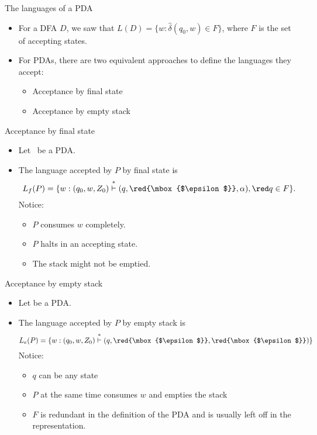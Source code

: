\documentclass{prosper}%
\newcommand{\e} {{\mbox{$\epsilon$}}}
\newcommand{\cvd}{\mbox{$\;\overset{*}{\vdash}\;$}}
\begin{document}
\begin{slide}{The languages of a PDA}
\begin{itemize}
\item For a DFA $D$, we saw that $L(D)=\{w: \hat{\delta}(q_0, w)\in F\}$, where $F$ is the set of accepting states.
\item For PDAs, there are two {\blue equivalent} approaches to define the languages they accept:
\begin{itemize}
\item Acceptance by final state
\item Acceptance by empty stack
\end{itemize}
\end{itemize}
\end{slide}
 
 \begin{slide}{Acceptance by final state}
\begin{itemize}
\item  Let \ be a PDA. 
\item The language accepted by $P$ by {\blue final state} is
 \[
 L_{f}(P ) = \{w : (q_0, w, Z_0)\cvd(q,{\red \e},\alpha), {\red q \in F} \}.
\]
Notice:
\begin{itemize}
\item $P$ consumes $w$ completely.
\item $P$ halts in an accepting state.
\item The stack might not be emptied.
\end{itemize}
\end{itemize}
\end{slide}


\begin{slide}{Acceptance by empty stack}
\begin{itemize}
\item Let  be a PDA.
\item The language accepted by $P$ by {\blue empty stack} is
\[
L_{e}(P)=\{w:(q_0,w,Z_0)\cvd (q, {\red \e}, {\red \e})\}
\]
Notice:
\begin{itemize}
\item  $q$ can be any state
\item $P$ at the same time consumes $w$ and empties the stack
\item $F$ is redundant in the definition of the PDA and is usually left off in the representation.
\end{itemize}
\end{itemize}
\end{slide}
\end{document}
